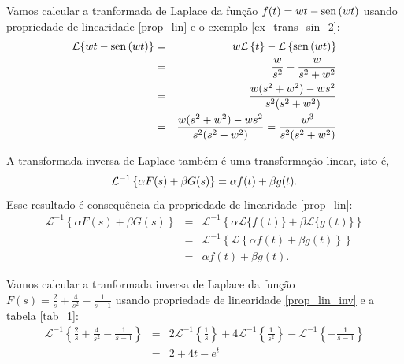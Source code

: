\begin{ex}Vamos calcular a tranformada de Laplace da função $f(t)=wt-\operatorname{sen}\,(wt)$ usando propriedade de linearidade \ref{prop_lin} e o exemplo \ref{ex_trans_sin_2}:
\begin{eqnarray*}
\mathcal{L }\{wt-\operatorname{sen}\,(wt)\}&=& w\mathcal{L }\left\{ t\right\}- \mathcal{L }\left\{ \operatorname{sen}\,(wt)\right\}\\
&=&\frac{w}{s^2}-\frac{w}{s^2+w^2}\\
&=&\frac{w(s^2+w^2)-ws^2}{s^2(s^2+w^2)}\\
&=&\frac{w(s^2+w^2)-ws^2}{s^2(s^2+w^2)}=\frac{w^3}{s^2(s^2+w^2)}\\
\end{eqnarray*} 
\end{ex}
\begin{obs}A transformada inversa de Laplace também é uma transformação linear, isto é,
\begin{equation}{\label{prop_lin_inv}}
\mathcal{L }^{-1}\left\{\alpha F(s)+\beta G(s)\right\}=\alpha f(t)+\beta g(t).
\end{equation}
Esse resultado é consequência da propriedade de linearidade \ref{prop_lin}:
\begin{eqnarray*}
\mathcal{L }^{-1}\left\{\alpha F(s)+\beta G(s)\right\}&=&\mathcal{L }^{-1}\left\{\alpha \mathcal{L}\{f(t)\}+\beta \mathcal{L}\{g(t)\}\right\}\\
&=&\mathcal{L }^{-1}\left\{\mathcal{L}\left\{\alpha f(t)+\beta g(t)\right\}\right\}\\
&=&\alpha  f(t)+\beta g(t).
\end{eqnarray*}
\end{obs}
\begin{ex}Vamos calcular a tranformada inversa de Laplace da função $F(s)=\frac{2}{s}+\frac{4}{s^2}-\frac{1}{s-1}$ usando propriedade de linearidade \ref{prop_lin_inv} e a tabela \ref{tab_1}:
\begin{eqnarray*}
\mathcal{L }^{-1}\left\{\frac{2}{s}+\frac{4}{s^2}-\frac{1}{s-1}\right\}&=& 2\mathcal{L }^{-1}\left\{\frac{1}{s}\right\}+4\mathcal{L }^{-1}\left\{\frac{1}{s^2}\right\}-\mathcal{L }^{-1}\left\{-\frac{1}{s-1}\right\}\\
&=&2+4t-e^t
\end{eqnarray*} 
\end{ex}


